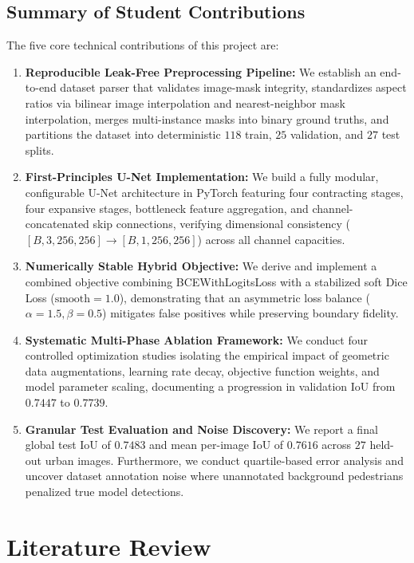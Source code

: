 \documentclass[10pt,a4paper]{report}
\begin{document}
\section{Summary of Student Contributions}
The five core technical contributions of this project are:
\begin{enumerate}
    \item \textbf{Reproducible Leak-Free Preprocessing Pipeline:} We establish an end-to-end dataset parser that validates image-mask integrity, standardizes aspect ratios via bilinear image interpolation and nearest-neighbor mask interpolation, merges multi-instance masks into binary ground truths, and partitions the dataset into deterministic $118$ train, $25$ validation, and $27$ test splits.
    \item \textbf{First-Principles U-Net Implementation:} We build a fully modular, configurable U-Net architecture in PyTorch featuring four contracting stages, four expansive stages, bottleneck feature aggregation, and channel-concatenated skip connections, verifying dimensional consistency ($[B, 3, 256, 256] \to [B, 1, 256, 256]$) across all channel capacities.
    \item \textbf{Numerically Stable Hybrid Objective:} We derive and implement a combined objective combining BCEWithLogitsLoss with a stabilized soft Dice Loss ($\text{smooth}=1.0$), demonstrating that an asymmetric loss balance ($\alpha=1.5, \beta=0.5$) mitigates false positives while preserving boundary fidelity.
    \item \textbf{Systematic Multi-Phase Ablation Framework:} We conduct four controlled optimization studies isolating the empirical impact of geometric data augmentations, learning rate decay, objective function weights, and model parameter scaling, documenting a progression in validation IoU from $0.7447$ to $0.7739$.
    \item \textbf{Granular Test Evaluation and Noise Discovery:} We report a final global test IoU of $\mathbf{0.7483}$ and mean per-image IoU of $\mathbf{0.7616}$ across $27$ held-out urban images. Furthermore, we conduct quartile-based error analysis and uncover dataset annotation noise where unannotated background pedestrians penalized true model detections.
\end{enumerate}

\chapter{Literature Review}
\label{chap:literature_review}
\end{document}
